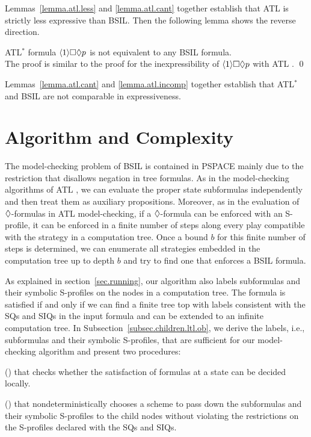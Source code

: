 Lemmas~\ref{lemma.atl.less} and \ref{lemma.atl.cant} together establish  
that ATL is strictly less expressive than BSIL. 
Then the following lemma shows the reverse direction.  

{\lemma \label{lemma.atl.incomp}
ATL$^*$ formula $\langle 1\rangle\Box\Diamond p$
is not equivalent to any BSIL formula.
} 
\\\pf 
The proof is similar to the proof for the inexpressibility of 
$\langle 1\rangle\Box\Diamond p$ with ATL \cite{AHK02}.  
\qed 

Lemmas~\ref{lemma.atl.cant} and \ref{lemma.atl.incomp}
together establish  
that ATL$^*$ and BSIL are not comparable in expressiveness. 

\section{Algorithm and Complexity}
The model-checking problem of BSIL is contained in 
PSPACE mainly due to the restriction that disallows 
negation in tree formulas.
As in the model-checking algorithms 
of ATL \cite{AHK02}, we can evaluate the proper state subformulas \label{reply1.subformulas.formulas} 
independently and then treat them as auxiliary propositions.  
Moreover, as in the evaluation of $\Diamond$-formulas in 
ATL model-checking, 
if a $\Diamond$-formula can be enforced with an S-profile, it can be enforced 
in a finite number of steps along every play compatible with 
the strategy in a computation tree.  
Once a bound $b$ for this finite number of steps is determined, 
we can enumerate all strategies embedded in the computation 
tree up to depth $b$ and try to find one that enforces a BSIL formula.  

\label{reply2.exp.alg2} 
As explained in section~\ref{sec.running}, 
our algorithm also labels subformulas and their symbolic S-profiles 
on the nodes in a computation tree. 
The formula is satisfied if and only if we can 
find a finite tree top with labels consistent with the SQs and SIQs in the input formula 
and can be extended to an infinite computation tree. 
In Subsection~\ref{subsec.children.ltl.ob},
we derive the labels, i.e., subformulas and their symbolic S-profiles, that are 
sufficient for our model-checking algorithm and 
present two procedures: 
\begin{list1} 
\item \tteval() that checks whether the satisfaction of formulas at a state 
	can be decided locally.  
\item \ttsynsuc() that nondeterministically chooses a scheme to 
	pass down the subformulas and their symbolic S-profiles to the child nodes 
	without violating the restrictions on the S-profiles declared with the SQs and SIQs. 
\end{list1} 

